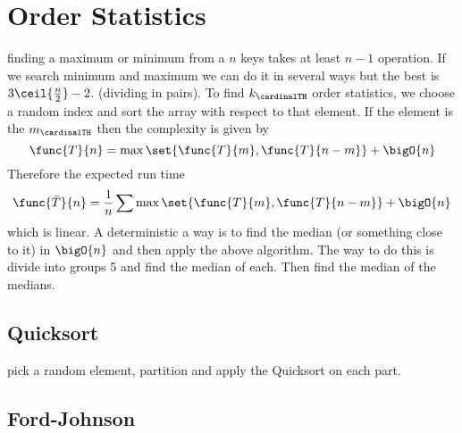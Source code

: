 \chapter{Order Statistics}
finding a maximum or minimum from a \(n\) keys takes at least \(n-1\) operation. If we search minimum and maximum we can do it in several ways but the best is \(3 \ceil{\frac{n}{2}} - 2\). (dividing in pairs).
To find \(k_\cardinalTH\) order statistics, we choose a random index and sort the array with respect to that element. If the element is the \(m_\cardinalTH\) then the complexity is given by
\begin{equation*}
    \func{T}{n} = \max \set{\func{T}{m}, \func{T}{n-m}} + \bigO{n}
\end{equation*}
Therefore the expected run time
\begin{equation*}
    \func{\bar{T}}{n} = \dfrac{1}{n} \sum \max \set{\func{T}{m}, \func{T}{n-m}} + \bigO{n}
\end{equation*}
which is linear. A deterministic a way is to find the median (or something close to it) in \(\bigO{n}\) and then apply the above algorithm. The way to do this is divide into groups 5 and find the median of each. Then find the median of the medians.
\section{Quicksort}
pick a random element, partition and apply the Quicksort on each part.
\section{Ford-Johnson}

